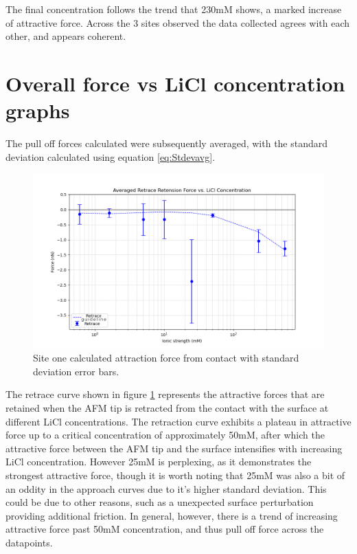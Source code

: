 The final concentration follows the trend that 230mM shows, a marked increase of attractive force. Across the 3 sites observed the data collected agrees with each other, and appears coherent.

\section{Overall force vs LiCl concentration graphs}

The pull off forces calculated were subsequently averaged, with the standard deviation calculated using equation \ref{eq:Stdevavg}.

\begin{figure}
    \centering
    \includegraphics[width=1\linewidth]{chapter6/Averages.png}
    \caption{Site one calculated attraction force from contact with standard deviation error bars.}
    \label{fig:site1cont}
\end{figure}


The retrace curve shown in figure \ref{fig:site1cont} represents the attractive forces that are retained when the AFM tip is retracted from the contact with the surface at different LiCl concentrations. The retraction curve exhibits a plateau in attractive force up to a critical concentration of approximately 50mM, after which the attractive force between the AFM tip and the surface intensifies with increasing LiCl concentration. However 25mM is perplexing, as it demonstrates the strongest attractive force, though it is worth noting that 25mM was also a bit of an oddity in the approach curves due to it's higher standard deviation. This could be due to other reasons, such as a unexpected surface perturbation providing additional friction. In general, however, there is a trend of increasing attractive force past 50mM concentration, and thus pull off force across the datapoints.

